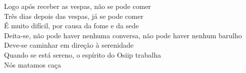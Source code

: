 \bigskip

\begin{linenumbers}\begingroup\raggedright
 
\noindent Logo após receber as vespas, não se pode comer\\
 Três dias depois das vespas, já se pode comer\\
 É muito difícil, por causa da fome e da sede\\
 Deita-se, não pode haver nenhuma conversa, não pode haver nenhum barulho\\
 Deve-se caminhar em direção à serenidade\\
 Quando se está sereno, o espírito do Osiip trabalha\\
 Nós matamos caça
 
\end{linenumbers}\endgroup

\bigskip

